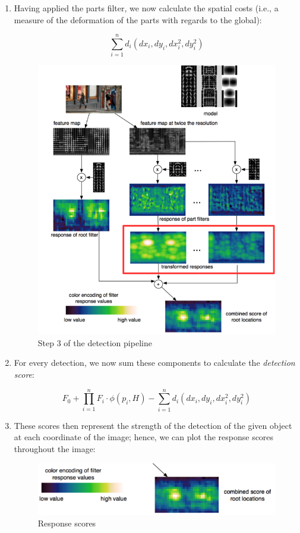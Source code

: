 \documentclass{article}
\begin{document}
\begin{enumerate}
\item Having applied the parts filter, we now calculate the spatial costs (i.e., a measure of the deformation of the parts with regards to the global):

$$ \sum_{i=1}^{n}d_i(dx_i,dy_i,dx_i^2, dy_i^2) $$

\begin{figure}[h!]
	\center
	\includegraphics[scale=0.2]{pipeline2b.png}
    \caption{Step 3 of the detection pipeline}
    \label{fig:pipeline2b}
\end{figure}


\item For every detection, we now sum these components to calculate the \textit{detection score}:

$$ F_0 + \prod_{i=1}^{n}F_i \cdot \phi(p_i,H) - \sum_{i=1}^{n}d_i(dx_i,dy_i,dx_i^2, dy_i^2)$$

\item These scores then represent the strength of the detection of the given object at each coordinate of the image; hence, we can plot the response scores throughout the image:

\begin{figure}[h!]
	\center
	\includegraphics[scale=0.5]{pipelinescoreplot.png}
    \caption{Response scores}
    \label{fig:pipelinescoreplot}
\end{figure}

\end{enumerate}
\end{document}
